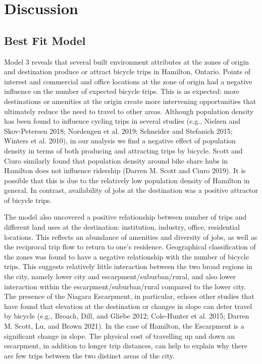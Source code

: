 \documentclass[smallextended]{svjour3}       %
\begin{document}
\hypertarget{sec:discussion}{%
\section{Discussion}\label{sec:discussion}}

\hypertarget{best-fit-model}{%
\subsection{Best Fit Model}\label{best-fit-model}}

Model 3 reveals that several built environment attributes at the zones
of origin and destination produce or attract bicycle trips in Hamilton,
Ontario. Points of interest and commercial and office locations at the
zone of origin had a negative influence on the number of expected
bicycle trips. This is as expected: more destinations or amenities at
the origin create more intervening opportunities that ultimately reduce
the need to travel to other areas. Although population density has been
found to influence cycling trips in several studies (e.g., Nielsen and
Skov-Petersen 2018; Nordengen et al. 2019; Schneider and Stefanich 2015;
Winters et al. 2010), in our analysis we find a negative effect of
population density in terms of both producing and attracting trips by
bicycle. Scott and Ciuro similarly found that population density around
bike share hubs in Hamilton does not influence ridership (Darren M.
Scott and Ciuro 2019). It is possible that this is due to the relatively
low population density of Hamilton in general. In contrast, availability
of jobs at the destination was a positive attractor of bicycle trips.

The model also uncovered a positive relationship between number of trips
and different land uses at the destination: institution, industry,
office, residential locations. This reflects an abundance of amenities
and diversity of jobs, as well as the reciprocal trip flow to return to
one's residence. Geographical classification of the zones was found to
have a negative relationship with the number of bicycle trips. This
suggests relatively little interaction between the two broad regions in
the city, namely lower city and escarpment/suburban/rural, and also
lower interaction within the escarpment/suburban/rural compared to the
lower city. The presence of the Niagara Escarpment, in particular,
echoes other studies that have found that elevation at the destination
or changes in slope can deter travel by bicycle (e.g., Broach, Dill, and
Gliebe 2012; Cole-Hunter et al. 2015; Darren M. Scott, Lu, and Brown
2021). In the case of Hamilton, the Escarpment is a significant change
in slope. The physical cost of travelling up and down an escarpment, in
addition to longer trip distances, can help to explain why there are few
trips between the two distinct areas of the city.
\end{document}
